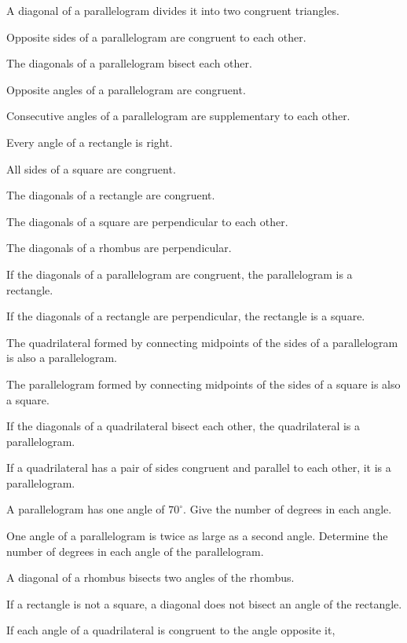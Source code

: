 \documentclass[11pt]{book}
\begin{document}
\begin{exercisecols}
\begin{exlist}
\item A diagonal of a parallelogram divides it into two congruent triangles.
\item Opposite sides of a parallelogram are congruent to each other.
\item The diagonals of a parallelogram bisect each other.
\item Opposite angles of a parallelogram are congruent.
\item Consecutive angles of a parallelogram are supplementary to each other.
\item Every angle of a rectangle is right.
\item All sides of a square are congruent.
\item The diagonals of a rectangle are congruent.
\item The diagonals of a square are perpendicular to each other.
\item The diagonals of a rhombus are perpendicular.
\item If the diagonals of a parallelogram are congruent, the parallelogram is
  a rectangle.
\item If the diagonals of a rectangle are perpendicular, the rectangle is a
  square.
\item The quadrilateral formed by connecting midpoints of the sides of a
  parallelogram is also a parallelogram.
\item The parallelogram formed by connecting midpoints of the sides of a
  square is also a square.
\item If the diagonals of a quadrilateral bisect each other, the quadrilateral
  is a parallelogram.
\item If a quadrilateral has a pair of sides congruent and parallel to each
  other, it is a parallelogram.
\item A parallelogram has one angle of $70^\circ$. Give the number of degrees
  in each angle.
\item One angle of a parallelogram is twice as large as a second angle.
  Determine the number of degrees in each angle of the parallelogram.
\item A diagonal of a rhombus bisects two angles of the rhombus.
\item If a rectangle is not a square, a diagonal does not bisect an angle of
  the rectangle.
\item If each angle of a quadrilateral is congruent to the angle opposite it,

\end{exlist}
\end{exercisecols}
\end{document}
